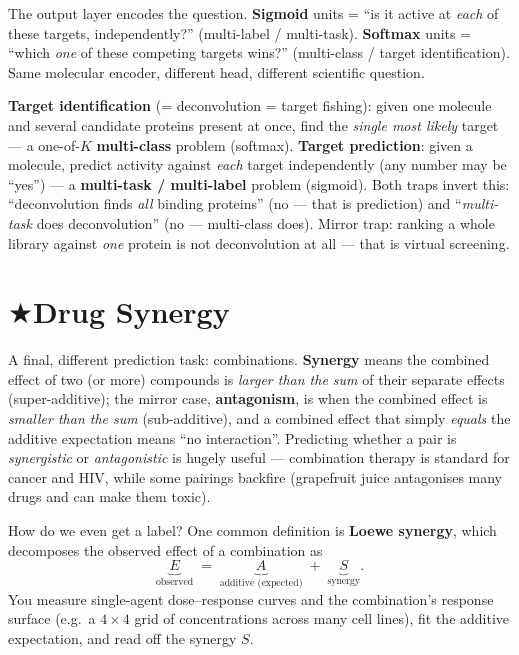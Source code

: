 \documentclass[11pt, oneside]{book}
\makeatletter
\newcommand{\starglyph}{\textcolor{stargold}{\ensuremath{\bigstar}}}
\newcommand{\starsec}[1]{%
  \texorpdfstring{\starglyph\hspace{0.4em}\textcolor{star@frame}{#1}}{#1}}
\makeatother
\begin{document}
\begin{intbox}
The output layer encodes the question. \textbf{Sigmoid} units = ``is it active at
\emph{each} of these targets, independently?'' (multi-label / multi-task).
\textbf{Softmax} units = ``which \emph{one} of these competing targets wins?''
(multi-class / target identification). Same molecular encoder, different head,
different scientific question.
\end{intbox}

\begin{starbox}[title={Exam-critical: target \emph{prediction} vs.\ \emph{identification}}]
\textbf{Target identification} (= deconvolution = target fishing): given one
molecule and several candidate proteins present at once, find the \emph{single most
likely} target --- a one-of-$K$ \textbf{multi-class} problem (softmax). \textbf{Target
prediction}: given a molecule, predict activity against \emph{each} target
independently (any number may be ``yes'') --- a \textbf{multi-task / multi-label}
problem (sigmoid). Both traps invert this: ``deconvolution finds \emph{all} binding
proteins'' (no --- that is prediction) and ``\emph{multi-task} does deconvolution''
(no --- multi-class does). Mirror trap: ranking a whole library against \emph{one}
protein is not deconvolution at all --- that is virtual screening.
\end{starbox}

\section{\starsec{Drug Synergy}}

A final, different prediction task: combinations. \textbf{Synergy} means the
combined effect of two (or more) compounds is \emph{larger than the sum} of their
separate effects (super-additive); the mirror case, \textbf{antagonism}, is when
the combined effect is \emph{smaller than the sum} (sub-additive), and a combined
effect that simply \emph{equals} the additive expectation means ``no interaction''.
Predicting whether a pair is \emph{synergistic} or \emph{antagonistic} is hugely
useful --- combination therapy is standard for
cancer and HIV, while some pairings backfire (grapefruit juice antagonises many
drugs and can make them toxic).

How do we even get a label? One common definition is \textbf{Loewe synergy}, which
decomposes the observed effect of a combination as
\[
  \underbrace{E}_{\text{observed}} \;=\;
  \underbrace{A}_{\text{additive (expected)}} \;+\;
  \underbrace{S}_{\text{synergy}} .
\]
You measure single-agent dose--response curves and the combination's response
surface (e.g.\ a $4\times4$ grid of concentrations across many cell lines), fit
the additive expectation, and read off the synergy $S$.
\end{document}
